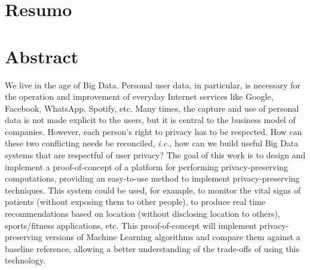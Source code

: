 %

\chapter*{Resumo} %
\thispagestyle{empty}



\newpage

\chapter*{Abstract} %
\thispagestyle{empty}

We live in the age of Big Data. Personal user data, in particular, is necessary for the operation and improvement of everyday Internet services like Google, Facebook, WhatsApp, Spotify, etc. Many times, the capture and use of personal data is not made explicit to the users, but it is central to the business model of companies. However, each person’s right to privacy has to be respected. How can these two conflicting needs be reconciled, \textit{i.e.}, how can we build useful Big Data systems that are respectful of user privacy?
The goal of this work is to design and implement a proof-of-concept of a platform for performing privacy-preserving computations, providing an easy-to-use method to implement privacy-preserving techniques. This system could be used, for example, to monitor the vital signs of patients (without exposing them to other people), to produce real time recommendations based on location (without disclosing location to others), sports/fitness applications, etc.
This proof-of-concept will implement privacy-preserving versions of Machine Learning algorithms and compare them against a baseline reference, allowing a better understanding of the trade-offs of using this technology. 

\newpage

